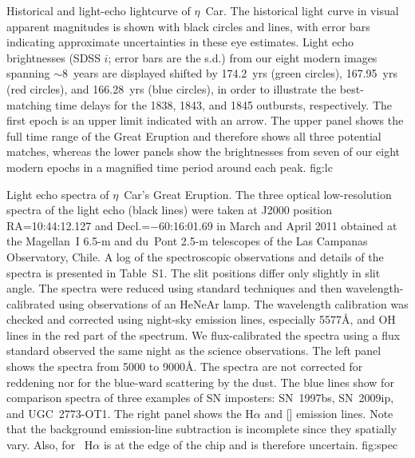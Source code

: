 {Historical and light-echo lightcurve of $\eta$~Car. The historical
light curve\cite{SF11} in visual apparent magnitudes is shown with
black circles and lines, with error bars indicating approximate
uncertainties in these eye estimates.  Light echo brightnesses (SDSS
$i$; error bars are the s.d.) from our eight modern images spanning
$\sim$8~years are displayed shifted by 174.2~yrs (green circles),
167.95~yrs (red circles), and 166.28~yrs (blue circles), in order to
illustrate the best-matching time delays for the 1838, 1843, and 1845
outbursts, respectively.
The first epoch is an upper limit indicated with an arrow. 
The upper panel shows the full time range of the Great
Eruption and therefore shows all three potential matches, whereas the
lower panels show the brightnesses from seven of our eight modern
epochs in a magnified time period around each peak.
}
{fig:lc}

{Light echo spectra of $\eta$~Car's Great Eruption.  The three optical
low-resolution spectra of the light echo (black lines) were taken at
J2000 position RA=10:44:12.127 and Decl.=$-$60:16:01.69 in March and
April 2011 obtained at the Magellan~I 6.5-m and du~Pont 2.5-m
telescopes of the Las Campanas Observatory, Chile. 
A log of the spectroscopic observations and
details of the spectra is presented in Table~S1.
\ifcheck
\fi
The slit positions differ only slightly in slit angle.
The spectra were reduced using standard techniques and then
wavelength-calibrated using observations of an HeNeAr lamp. The
wavelength calibration was checked and corrected using night-sky
emission lines, especially  5577\AA, and OH lines in the red
part of the spectrum. We flux-calibrated the spectra using a flux
standard observed the same night as the science observations.  The
left panel shows the spectra from 5000 to 9000\AA.  The spectra are
not corrected for reddening nor for the blue-ward scattering by the
dust.  The blue lines show for comparison spectra of three examples of
SN imposters: SN~1997bs, SN~2009ip, and UGC~2773-OT1.  The right panel
shows the H$\alpha$ and [] emission lines. Note that the
background emission-line subtraction is incomplete since they
spatially vary. Also, for
\specMhi\ H$\alpha$ is at the edge of the chip and is therefore uncertain.
}
{fig:spec}

